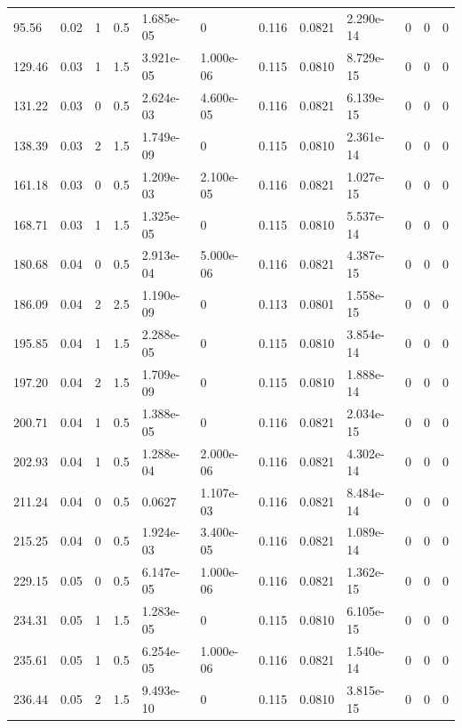 \documentclass[preview]{standalone}
\begin{document}
{{\begin{tabular}{L{1.2cm}C{1.2cm} C{0.3cm}C{0.5cm} C{1.4cm}C{1.4cm} C{1.4cm}C{1.4cm} C{1.6cm}C{1.6cm} C{1.6cm}C{1.6cm}}
  95.56  &  0.02  & 1     & 0.5 &  1.685e-05  & 0  &  0.116&   0.0821& 2.290e-14 & 0   &  0 & 0  \\ 
  129.46  &  0.03  & 1     & 1.5 &  3.921e-05  & 1.000e-06  &  0.115&   0.0810& 8.729e-15 & 0   &  0 & 0  \\ 
  131.22  &  0.03  & 0     & 0.5 &  2.624e-03  & 4.600e-05  &  0.116&   0.0821& 6.139e-15 & 0   &  0 & 0  \\ 
  138.39  &  0.03  & 2     & 1.5 &  1.749e-09  & 0  &  0.115&   0.0810& 2.361e-14 & 0   &  0 & 0  \\ 
  161.18  &  0.03  & 0     & 0.5 &  1.209e-03  & 2.100e-05  &  0.116&   0.0821& 1.027e-15 & 0   &  0 & 0  \\ 
  168.71  &  0.03  & 1     & 1.5 &  1.325e-05  & 0  &  0.115&   0.0810& 5.537e-14 & 0   &  0 & 0  \\ 
  180.68  &  0.04  & 0     & 0.5 &  2.913e-04  & 5.000e-06  &  0.116&   0.0821& 4.387e-15 & 0   &  0 & 0  \\ 
  186.09  &  0.04  & 2     & 2.5 &  1.190e-09  & 0  &  0.113&   0.0801& 1.558e-15 & 0   &  0 & 0  \\ 
  195.85  &  0.04  & 1     & 1.5 &  2.288e-05  & 0  &  0.115&   0.0810& 3.854e-14 & 0   &  0 & 0  \\ 
  197.20  &  0.04  & 2     & 1.5 &  1.709e-09  & 0  &  0.115&   0.0810& 1.888e-14 & 0   &  0 & 0  \\ 
  200.71  &  0.04  & 1     & 0.5 &  1.388e-05  & 0  &  0.116&   0.0821& 2.034e-15 & 0   &  0 & 0  \\ 
  202.93  &  0.04  & 1     & 0.5 &  1.288e-04  & 2.000e-06  &  0.116&   0.0821& 4.302e-14 & 0   &  0 & 0  \\ 
  211.24  &  0.04  & 0     & 0.5 &  0.0627  & 1.107e-03  &  0.116&   0.0821& 8.484e-14 & 0   &  0 & 0  \\ 
  215.25  &  0.04  & 0     & 0.5 &  1.924e-03  & 3.400e-05  &  0.116&   0.0821& 1.089e-14 & 0   &  0 & 0  \\ 
  229.15  &  0.05  & 0     & 0.5 &  6.147e-05  & 1.000e-06  &  0.116&   0.0821& 1.362e-15 & 0   &  0 & 0  \\ 
  234.31  &  0.05  & 1     & 1.5 &  1.283e-05  & 0  &  0.115&   0.0810& 6.105e-15 & 0   &  0 & 0  \\ 
  235.61  &  0.05  & 1     & 0.5 &  6.254e-05  & 1.000e-06  &  0.116&   0.0821& 1.540e-14 & 0   &  0 & 0  \\ 
  236.44  &  0.05  & 2     & 1.5 &  9.493e-10  & 0  &  0.115&   0.0810& 3.815e-15 & 0   &  0 & 0  \\ 

\end{tabular}}}
\end{document}
